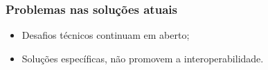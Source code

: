 \begin{frame}
    \frametitle{Problemas nas soluções atuais}
    \begin{itemize}
        \item Desafios técnicos continuam em aberto;
        \item Soluções específicas, não promovem a interoperabilidade.
    \end{itemize}
\end{frame}
